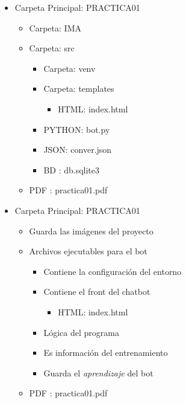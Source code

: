 \documentclass[a4paper,12pt]{article}
\begin{document}
\begin{minipage}[t]{6.8cm}
\begin{itemize}
    \item Carpeta Principal: PRACTICA01
    \begin{itemize}
        \item Carpeta: IMA
        \item Carpeta: src
        \begin{itemize}
            \item Carpeta: venv
            \item Carpeta: templates            
            \begin{itemize}
                \item HTML: index.html
            \end{itemize}
            \item PYTHON: bot.py
            \item JSON: conver.json
            \item BD : db.sqlite3
        \end{itemize}
        \item PDF : practica01.pdf
    \end{itemize}
\end{itemize}
\end{minipage}
\hspace{2mm}
\begin{minipage}[t]{9cm}
    \begin{itemize}
        \item[] Carpeta Principal: PRACTICA01
        \begin{itemize}
            \item[] Guarda las imágenes del proyecto 
            \item[] Archivos ejecutables para el bot
            \begin{itemize}
                \item[] Contiene la configuración del entorno
                \item[] Contiene el front del chatbot            
                \begin{itemize}
                    \item[] HTML: index.html
                \end{itemize}
                \item[] Lógica del programa
                \item[] Es información del entrenamiento
                \item[] Guarda el \textit{aprendizaje} del bot 
            \end{itemize}
            \item[] PDF : practica01.pdf
        \end{itemize}
    \end{itemize}
\end{minipage}
\end{document}
